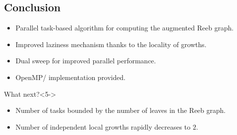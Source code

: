 \subsection*{Conclusion}
\begin{frame*}
\begin{itemize}[<+->]
\item Parallel task-based algorithm for computing the augmented Reeb graph.
\item Improved laziness mechanism thanks to the locality of growths.
\item Dual sweep for improved parallel performance.
\item OpenMP/\cpluspluslogo{} implementation provided.
\end{itemize}
\begin{block}{What next?}<5->
\begin{itemize}
\item<6-> Number of tasks bounded by the number of leaves in the Reeb graph.
\item<7-> Number of independent local growths rapidly decreases to $2$.
\end{itemize}
\end{block}
\end{frame*}